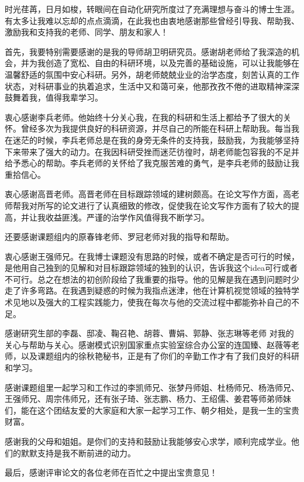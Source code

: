 时光荏苒，日月如梭，转眼间在自动化研究所度过了充满理想与奋斗的博士生涯。有太多让我难以忘却的点点滴滴，在此我也由衷地感谢那些曾经引导我、帮助我、激励我和支持我的老师、同学、朋友和家人！

首先，我要特别需要感谢的是我的导师胡卫明研究员。感谢胡老师给了我深造的机会，并为我创造了宽松、自由的科研环境，以及完善的基础设施，可以让我能够在温馨舒适的氛围中安心科研。另外，胡老师兢兢业业的治学态度，刻苦认真的工作状态，对科研事业的执着追求，生活中又和蔼可亲，他那孜孜不倦的进取精神深深鼓舞着我，值得我辈学习。

衷心感谢李兵老师。他始终十分关心我，在我的科研和生活上都给予了很大的关怀。曾经多次为我提供良好的科研资源，并尽自己的所能在科研上帮助我。每当我在迷茫的时候，李兵老师总是在我的身旁无条件的支持我，鼓励我，为我能够坚持下来带来了强大的动力。在我因科研受挫而迷茫彷徨时，胡老师能包容我的不足并给予悉心的帮助。李兵老师的关怀给了我克服苦难的勇气，是李兵老师的鼓励让我重拾信心。

衷心感谢高晋老师。高晋老师在目标跟踪领域的建树颇高。在论文写作方面，高老师帮我对所写的论文进行了认真细致的修改，促使我在论文写作方面有了较大的提高，并让我收益匪浅。严谨的治学作风值得我不断学习。

还要感谢课题组内的原春锋老师、罗冠老师对我的指导和帮助。

衷心感谢王强师兄。在我博士课题没有思路的时候，或者不确定是否可行的时候，是他用自己独到的见解和对目标跟踪领域的独到的认识，告诉我这个idea可行或者不可行。总之在想法的初创阶段给了我重要的指导。他的见解是我在遇到问题时少走了许多弯路。在我遇到疑惑的时候为我指点迷津，他在计算机视觉领域的独特学术见地以及强大的工程实践能力，使我在每次与他的交流过程中都能弥补自己的不足。

感谢研究生部的李磊、邸凌、鞠召艳、胡蓉、曹娟、郭静、张志琳等老师
对我的关心与帮助与关心。感谢模式识别国家重点实验室综合办公室的连国臻、赵薇等老师，以及课题组内的徐秋艳秘书，正是有了你们的辛勤工作才有了我们良好的科研和学习。

感谢课题组里一起学习和工作过的李凯师兄、张梦丹师姐、杜杨师兄、杨浩师兄、王强师兄、周宗伟师兄，还有张子琦、张志鹏、杨力、王绍儒、姜君等师弟师妹们，能在这个团结友爱的大家庭和大家一起学习工作、朝夕相处，是我一生的宝贵财富。

感谢我的父母和姐姐。是你们的支持和鼓励让我能够安心求学，顺利完成学业。他们的默默支持是我不断前进的动力。

最后，感谢评审论文的各位老师在百忙之中提出宝贵意见！
\cleardoublepage[plain]%
